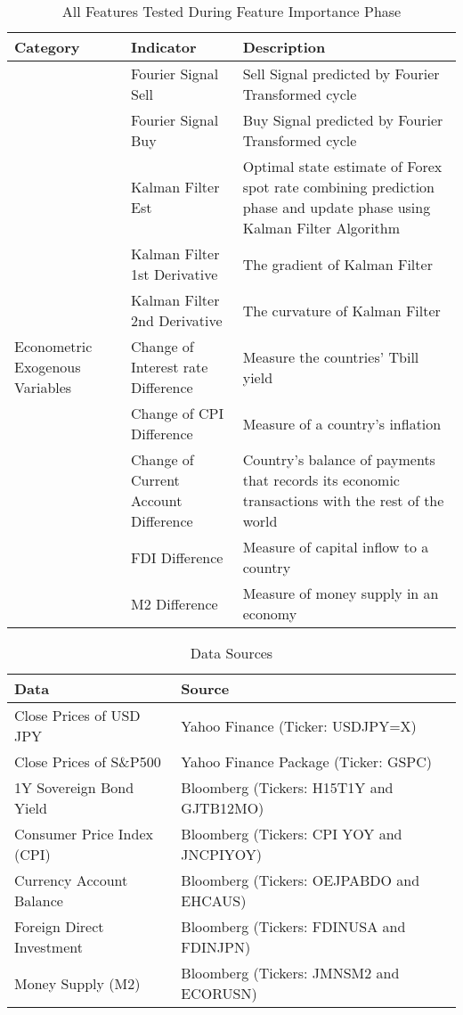 \documentclass{article}
\begin{document}
\begin{table}[h!]
\centering
\begin{tabular}{|p{2cm}|p{4cm}|p{6cm}|}
\hline
\textbf{Category} & \textbf{Indicator} & {Description}\\
\hline
{} & Fourier Signal Sell & Sell Signal predicted by Fourier Transformed cycle \\
\hline
{} & Fourier Signal Buy & Buy Signal predicted by Fourier Transformed cycle \\
\hline
{} & Kalman Filter Est & Optimal state estimate of Forex spot rate combining prediction phase and update phase using Kalman Filter Algorithm \\
\hline
{} & Kalman Filter 1st Derivative & The gradient of Kalman Filter \\
\hline
{} & Kalman Filter 2nd Derivative & The curvature of Kalman Filter \\
\hline
Econometric Exogenous Variables & Change of Interest rate Difference & Measure the countries’ Tbill yield \\
\hline
{} & Change of CPI Difference & Measure of a country’s inflation \\
\hline
{} & Change of Current Account Difference & Country’s balance of payments that records its economic transactions with the rest of the world \\
\hline
{} & FDI Difference & Measure of capital inflow to a country \\
\hline
{} & M2 Difference & Measure of money supply in an economy \\
\hline
\end{tabular}
\label{tab:wrapped_text_table}
\caption{All Features Tested During Feature Importance Phase}
\end{table}

\begin{table}[htbp]
    \centering
    \begin{tabular}{p{}p{}p{}} %
        \hline
        \textbf{Data} & \textbf{Source} \\
        \hline
        Close Prices of USD JPY & Yahoo Finance (Ticker: USDJPY=X)\\
        Close Prices of S\&P500 & Yahoo Finance Package (Ticker: GSPC) \\
        1Y Sovereign Bond Yield & Bloomberg (Tickers: H15T1Y and GJTB12MO)\\
        Consumer Price Index (CPI) & Bloomberg (Tickers: CPI YOY and JNCPIYOY) \\
        Currency Account Balance & Bloomberg (Tickers: OEJPABDO and EHCAUS)\\
        Foreign Direct Investment & Bloomberg (Tickers: FDINUSA and FDINJPN) \\
        Money Supply (M2) & Bloomberg (Tickers: JMNSM2 and ECORUSN) \\
        \hline
    \end{tabular}
    \caption{Data Sources}
\end{table}
\end{document}
